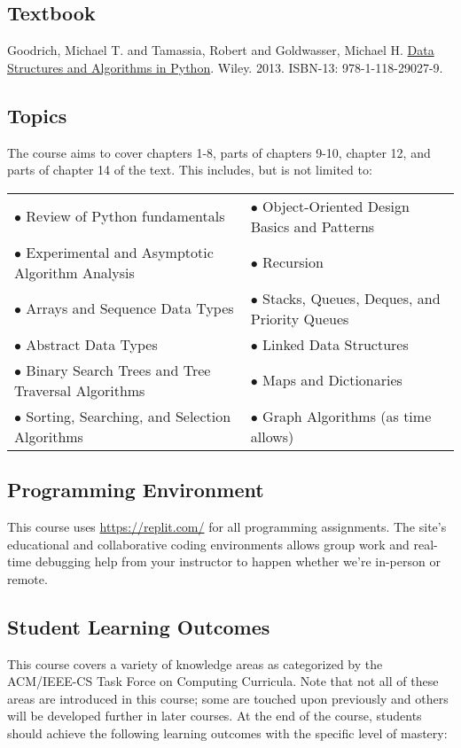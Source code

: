 \documentclass[10pt]{article}
\begin{document}
\subsection{Textbook}
\label{sec:orgc3d87e3}

\noindent
Goodrich, Michael T. and Tamassia, Robert and Goldwasser, Michael H. \underline{Data Structures and Algorithms in Python}. Wiley. 2013. ISBN-13: 978-1-118-29027-9.


\subsection{Topics}
\label{sec:org302b48c}
The course aims to cover chapters 1-8, parts of chapters 9-10,
chapter 12, and parts of chapter 14 of the text. This includes, but is
not limited to:

\begin{center}
\begin{tabular}{ll}
\(\bullet\) Review of Python fundamentals & \(\bullet\) Object-Oriented Design Basics and Patterns\\
\(\bullet\) Experimental and Asymptotic Algorithm Analysis & \(\bullet\) Recursion\\
\(\bullet\) Arrays and Sequence Data Types & \(\bullet\) Stacks, Queues, Deques, and Priority Queues\\
\(\bullet\) Abstract Data Types & \(\bullet\) Linked Data Structures\\
\(\bullet\) Binary Search Trees and Tree Traversal Algorithms & \(\bullet\) Maps and Dictionaries\\
\(\bullet\) Sorting, Searching, and Selection Algorithms & \(\bullet\) Graph Algorithms (as time allows)\\
\end{tabular}
\end{center}

\subsection{Programming Environment}
\label{sec:org16c7836}
This course uses \url{https://replit.com/} for all programming assignments. The site's educational and collaborative coding environments allows group work and real-time debugging help from your
instructor to happen whether we're in-person or remote.

\subsection{Student Learning Outcomes}
\label{sec:org99410f2}
This course covers a variety of knowledge areas as categorized by the
ACM/IEEE-CS Task Force on Computing Curricula. Note that not all of
these areas are introduced in this course; some are touched upon
previously and others will be developed further in later courses. At
the end of the course, students should achieve the following learning
outcomes with the specific level of mastery:
\end{document}
